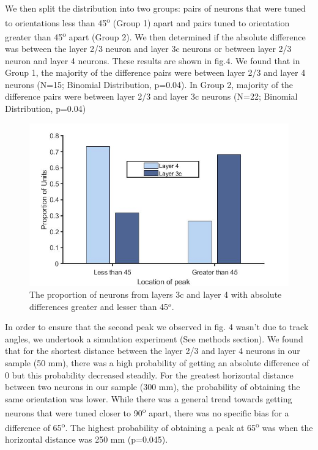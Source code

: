 We then split the distribution into two groups: pairs of neurons that
were tuned to orientations less than 45\textsuperscript{o} (Group 1)
apart and pairs tuned to orientation greater than 45\textsuperscript{o}
apart (Group 2). We then determined if the absolute difference was
between the layer 2/3 neuron and layer 3c neurons or between layer 2/3
neuron and layer 4 neurons. These results are shown in fig.4. We found
that in Group 1, the majority of the difference pairs were between layer
2/3 and layer 4 neurons (N=15; Binomial Distribution, p=0.04). In Group
2, majority of the difference pairs were between layer 2/3 and layer 3c
neurons (N=22; Binomial Distribution, p=0.04)


\begin{figure}[H]
	\centering
	\includegraphics[width= 0.5\linewidth]{ShrewV1/cmlayer.jpg}
	\caption{The proportion of neurons from layers 3c and layer 4 with absolute differences greater and lesser than 45$^o$.}
	\label{fig:cmlayer}
\end{figure}

In order to ensure that the second peak we observed in fig. 4 wasn't due
to track angles, we undertook a simulation experiment (See methods
section). We found that for the shortest distance between the layer 2/3
and layer 4 neurons in our sample (50 mm), there was a high probability
of getting an absolute difference of 0 but this probability decreased
steadily. For the greatest horizontal distance between two neurons in
our sample (300 mm), the probability of obtaining the same orientation
was lower. While there was a general trend towards getting neurons that
were tuned closer to 90\textsuperscript{o} apart, there was no specific
bias for a difference of 65\textsuperscript{o}. The highest probability
of obtaining a peak at 65\textsuperscript{o} was when the horizontal
distance was 250 mm (p=0.045).

